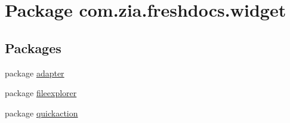 \hypertarget{namespacecom_1_1zia_1_1freshdocs_1_1widget}{\section{Package com.\-zia.\-freshdocs.\-widget}
\label{namespacecom_1_1zia_1_1freshdocs_1_1widget}
}
\subsection*{Packages}
\begin{DoxyCompactItemize}
\item 
package \hyperlink{namespacecom_1_1zia_1_1freshdocs_1_1widget_1_1adapter}{adapter}
\item 
package \hyperlink{namespacecom_1_1zia_1_1freshdocs_1_1widget_1_1fileexplorer}{fileexplorer}
\item 
package \hyperlink{namespacecom_1_1zia_1_1freshdocs_1_1widget_1_1quickaction}{quickaction}
\end{DoxyCompactItemize}
